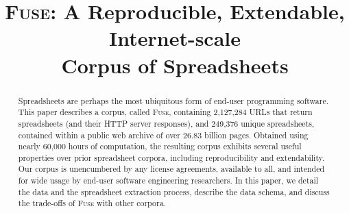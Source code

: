 \documentclass[conference]{IEEEtran}
\newcommand{\urlcount}{2,127,284}
\newcommand{\xlscount}{249,376}
\begin{document}
%
\title{\textsc{Fuse}: A Reproducible, Extendable, Internet-scale\\Corpus of Spreadsheets}

\author{
}

\maketitle

\begin{abstract}
Spreadsheets are perhaps the most ubiquitous form of end-user programming software. This paper describes a corpus, called \textsc{Fuse}, containing 
\urlcount{} URLs that return spreadsheets (and their HTTP server responses), and \xlscount{} unique spreadsheets, contained within a public web archive of over 26.83 billion pages. Obtained using nearly 60,000 hours of computation, the resulting corpus exhibits several useful properties over prior spreadsheet corpora, including reproducibility and extendability. Our corpus is unencumbered by any license agreements, available to all, and intended for wide usage by end-user software engineering researchers. In this paper, we detail the data and the spreadsheet extraction process, describe the data schema, and discuss the trade-offs of \textsc{Fuse} with other corpora.
\end{abstract}


\IEEEpeerreviewmaketitle


\end{document}
